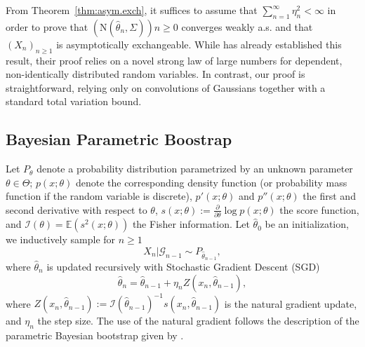 \documentclass{article}
\theoremstyle{definition}
\renewcommand{\&}{and}
\begin{document}
From Theorem~\ref{thm:asym.exch}, it suffices to assume that $\sum_{n=1}^\infty \eta_n^2 < \infty$ in order to prove that $(\text{N}(\hat{\theta}_{n},\Sigma)){n \geq 0}$ converges weakly a.s. and that $(X_n)_{n\geq 1}$ is asymptotically exchangeable. While \cite{garelli2024asymptotics} has already established this result, their proof relies on a novel strong law of large numbers for dependent, non-identically distributed random variables. In contrast, our proof is straightforward, relying only on convolutions of Gaussians together with a standard total variation bound.



\subsection{Bayesian Parametric Boostrap}\label{sec:param_boot}



Let $P_{\theta}$ denote a probability distribution parametrized by an unknown parameter $\theta \in \Theta$; $p(x;\theta)$ denote the corresponding density function (or probability mass function if the random variable is discrete), $p'(x;\theta)$ and $p''(x;\theta)$ the first and second derivative with respect to $\theta$, $s(x;\theta):= \frac{\partial}{\partial \theta} \log p(x;\theta)$ the score function, and $\mathcal{I}(\theta)=\mathbb{E}(s^{2}(x;\theta))$ the Fisher information. Let $\hat{\theta}_{0}$ be an initialization, we inductively sample for $n\geq 1$
\begin{equation}\label{eq:param_sequence}
    X_{n}|\mathcal{G}_{n-1} \sim P_{\hat{\theta}_{n-1}},
\end{equation}
where $\hat{\theta}_{n}$ is updated recursively with Stochastic Gradient Descent (SGD)
\begin{equation}\label{eq:sgd_natural}
\hat{\theta}_{n}= \hat{\theta}_{n-1} + \eta_n Z(x_n, \hat{\theta}_{n-1}),
\end{equation}
where $Z(x_n, \hat{\theta}_{n-1}):=\mathcal{I}(\hat{\theta}_{n-1})^{-1} s(x_n, \hat{\theta}_{n-1})$ is the natural gradient update, and $\eta_n$ the step size. %
The use of the natural gradient follows the description of the parametric Bayesian bootstrap given by \cite{fong2024asymptotics}. %
\end{document}
